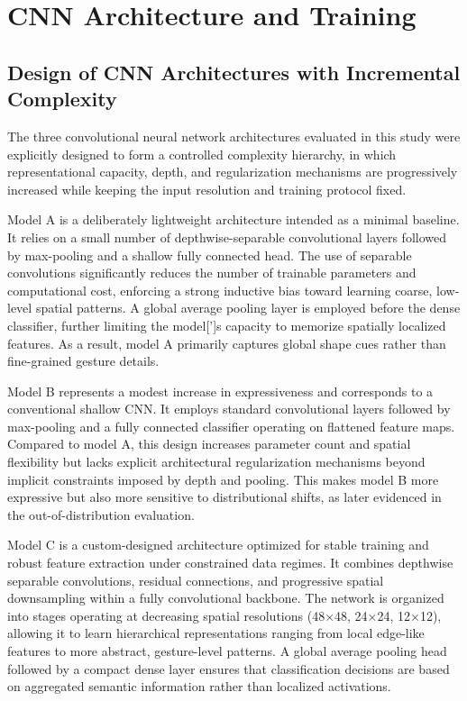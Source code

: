 \documentclass{article}
\begin{document}
\section{CNN Architecture and Training}
\subsection{Design of CNN Architectures with Incremental Complexity}

The three convolutional neural network architectures evaluated in this 
study were explicitly designed to form a controlled complexity hierarchy, 
in which representational capacity, depth, and regularization mechanisms 
are progressively increased while keeping the input resolution and 
training protocol fixed.

Model A is a deliberately lightweight architecture intended as a minimal 
baseline. It relies on a small number of depthwise-separable convolutional 
layers followed by max-pooling and a shallow fully connected head. The use 
of separable convolutions significantly reduces the number of trainable 
parameters and computational cost, enforcing a strong inductive bias toward 
learning coarse, low-level spatial patterns. A global average pooling layer 
is employed before the dense classifier, further limiting the model[']s 
capacity to memorize spatially localized features. As a result, model A 
primarily captures global shape cues rather than fine-grained gesture details.

Model B represents a modest increase in expressiveness and corresponds to 
a conventional shallow CNN. It employs standard convolutional layers 
followed by max-pooling and a fully connected classifier operating on 
flattened feature maps. Compared to model A, this design increases 
parameter count and spatial flexibility but lacks explicit architectural 
regularization mechanisms beyond implicit constraints imposed by depth 
and pooling. This makes model B more expressive but also more sensitive 
to distributional shifts, as later evidenced in the out-of-distribution 
evaluation.

Model C is a custom-designed architecture optimized for stable training 
and robust feature extraction under constrained data regimes. It combines 
depthwise separable convolutions, residual connections, and progressive 
spatial downsampling within a fully convolutional backbone. The network 
is organized into stages operating at decreasing spatial resolutions 
(48×48, 24×24, 12×12), allowing it to learn hierarchical representations 
ranging from local edge-like features to more abstract, gesture-level 
patterns. A global average pooling head followed by a compact dense 
layer ensures that classification decisions are based on aggregated 
semantic information rather than localized activations.
\end{document}
